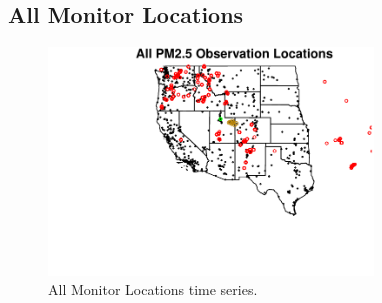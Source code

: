 \subsection{All Monitor Locations}
\begin{figure} 
\centering 
\includegraphics[width=0.77\textwidth]{Code_Outputs/All_Monitor_Locations_map.jpg} 
\caption{\label{fig:All_Monitor_LocationsTS}All Monitor Locations time series.} 
\end{figure} 
 
